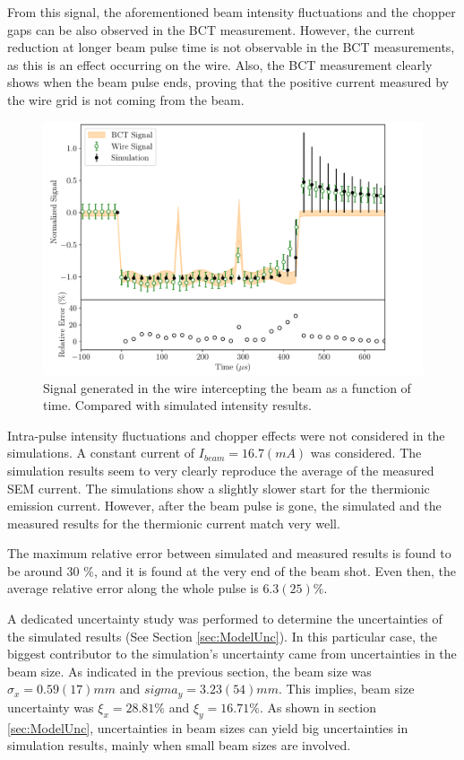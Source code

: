 From this signal, the aforementioned beam intensity fluctuations and the chopper gaps can be also observed in the BCT measurement. However, the current reduction at longer beam pulse time is not observable in the BCT measurements, as this is an effect occurring on the wire. Also, the BCT measurement clearly shows when the beam pulse ends, proving that the positive current measured by the wire grid is not coming from the beam. 

\begin{figure}[h]
    \centering
    \includegraphics[width=0.75\columnwidth]{Figure_MeasurementSimulationCompa/VerticalCompa.pdf}
    \caption{Signal generated in the wire intercepting the beam as a function of time. Compared with simulated intensity results. }
    \label{fig:MeasSimCompa}
\end{figure}

Intra-pulse intensity fluctuations and chopper effects were not considered in the simulations. A constant current of $I_{beam} = 16.7 (mA)$ was considered. The simulation results seem to very clearly reproduce the average of the measured SEM current. The simulations show a slightly slower start for the thermionic emission current. However, after the beam pulse is gone, the simulated and the measured results for the thermionic current match very well. 

The maximum relative error between simulated and measured results is found to be around 30 $\%$, and it is found at the very end of the beam shot. Even then, the average relative error along the whole pulse is $6.3(25) \%$. 

A dedicated uncertainty study was performed to determine the uncertainties of the simulated results (See Section \ref{sec:ModelUnc}). In this particular case, the biggest contributor to the simulation's uncertainty came from uncertainties in the beam size. As indicated in the previous section, the beam size was $\sigma_x = 0.59(17) mm$ and $sigma_y = 3.23(54) mm$. This implies, beam size uncertainty was $\xi_x = 28.81 \%$ and $\xi_y = 16.71 \%$. As shown in section \ref{sec:ModelUnc}, uncertainties in beam sizes can yield big uncertainties in simulation results, mainly when small beam sizes are involved. 

